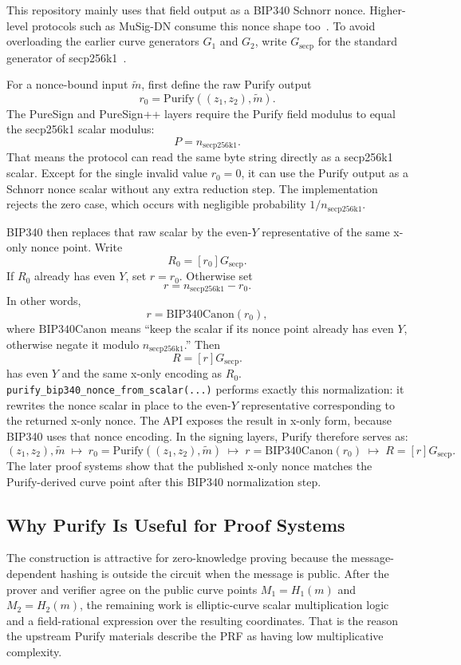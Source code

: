 \documentclass[11pt]{article}
\begin{document}
This repository mainly uses that field output as a BIP340 Schnorr
nonce. Higher-level protocols such as MuSig-DN consume this nonce shape too~\cite{bip340,musig-dn}.
To avoid overloading the earlier curve generators $G_1$ and $G_2$, write
$G_{\mathrm{secp}}$ for the standard generator of secp256k1~\cite{bip340}.

For a nonce-bound input $\widetilde{m}$, first define the raw Purify output
\[
r_0 = \mathrm{Purify}((z_1,z_2), \widetilde{m}).
\]
The PureSign and PureSign++ layers require the Purify field modulus to equal the secp256k1 scalar
modulus:
\[
P = n_{\mathrm{secp256k1}}.
\]
That means the protocol can read the same byte string directly as a secp256k1 scalar. Except for the
single invalid value $r_0 = 0$, it can use the Purify output as a Schnorr nonce scalar without any
extra reduction step. The implementation rejects the zero case, which occurs with negligible probability
$1 / n_{\mathrm{secp256k1}}$.

BIP340 then replaces that raw scalar by the even-$Y$ representative of the same x-only nonce point.
Write
\[
R_0 = [r_0]G_{\mathrm{secp}}.
\]
If $R_0$ already has even $Y$, set $r = r_0$. Otherwise set
\[
r = n_{\mathrm{secp256k1}} - r_0.
\]
In other words,
\[
r = \mathrm{BIP340Canon}(r_0),
\]
where $\mathrm{BIP340Canon}$ means ``keep the scalar if its nonce point already has even $Y$,
otherwise negate it modulo $n_{\mathrm{secp256k1}}$.''
Then
\[
R = [r]G_{\mathrm{secp}}.
\]
has even $Y$ and the same x-only encoding as $R_0$. \texttt{purify\_bip340\_nonce\_from\_scalar(...)}
performs exactly this normalization: it rewrites the nonce scalar in place to the
even-$Y$ representative corresponding to the returned x-only nonce. The API exposes the result in
x-only form, because BIP340 uses that nonce encoding. In the
signing layers, Purify therefore serves as:
\[
(z_1,z_2), \widetilde{m}
\;\longmapsto\;
r_0 = \mathrm{Purify}((z_1,z_2), \widetilde{m})
\;\longmapsto\;
r = \mathrm{BIP340Canon}(r_0)
\;\longmapsto\;
R = [r]G_{\mathrm{secp}}.
\]
The later proof systems show that the published x-only nonce matches the
Purify-derived curve point after this BIP340 normalization step.

\subsection{Why Purify Is Useful for Proof Systems}

The construction is attractive for zero-knowledge proving because the message-dependent hashing is
outside the circuit when the message is public. After the prover and verifier agree on the public
curve points $M_1 = H_1(m)$ and $M_2 = H_2(m)$, the remaining work is elliptic-curve scalar
multiplication logic and a field-rational expression over the resulting coordinates. That is the
reason the upstream Purify materials describe the PRF as having low multiplicative complexity.
\end{document}
